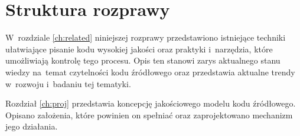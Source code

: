 \documentclass[twoside]{praca}
\begin{document}

\section{Struktura rozprawy}

W~rozdziale \ref{ch:related} niniejszej rozprawy przedstawiono istniejące techniki ułatwiające pisanie kodu wysokiej jakości oraz praktyki i~narzędzia, które umożliwiają kontrolę tego procesu. Opis ten stanowi zarys aktualnego stanu wiedzy na~temat czytelności 
kodu źródłowego oraz przedstawia aktualne trendy w~rozwoju i~badaniu tej tematyki.

Rozdział \ref{ch:proj} przedstawia koncepcję jakościowego modelu kodu źródłowego. Opisano założenia, które powinien on spełniać oraz zaprojektowano mechanizm jego działania.
\end{document}

